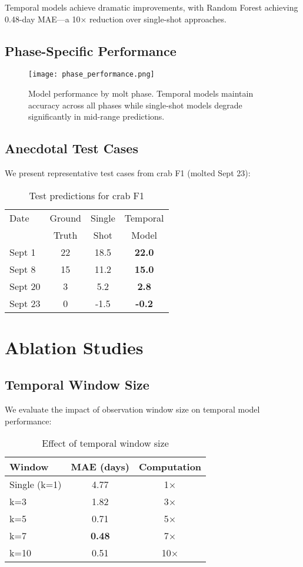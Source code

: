 \documentclass[10pt,twocolumn,letterpaper]{article}
\begin{document}
Temporal models achieve dramatic improvements, with Random Forest achieving 0.48-day MAE—a 10× reduction over single-shot approaches.

\subsection{Phase-Specific Performance}

\begin{figure}[h]
\centering
\texttt{[image: phase\_performance.png]}
\caption{Model performance by molt phase. Temporal models maintain accuracy across all phases while single-shot models degrade significantly in mid-range predictions.}
\end{figure}

\subsection{Anecdotal Test Cases}

We present representative test cases from crab F1 (molted Sept 23):

\begin{table}[h]
\centering
\caption{Test predictions for crab F1}
\begin{tabular}{lccc}
\toprule
Date & Ground & Single & Temporal \\
 & Truth & Shot & Model \\
\midrule
Sept 1 & 22 & 18.5 & \textbf{22.0} \\
Sept 8 & 15 & 11.2 & \textbf{15.0} \\
Sept 20 & 3 & 5.2 & \textbf{2.8} \\
Sept 23 & 0 & -1.5 & \textbf{-0.2} \\
\bottomrule
\end{tabular}
\end{table}

\section{Ablation Studies}

\subsection{Temporal Window Size}
We evaluate the impact of observation window size on temporal model performance:

\begin{table}[h]
\centering
\caption{Effect of temporal window size}
\begin{tabular}{lcc}
\toprule
Window & MAE (days) & Computation \\
\midrule
Single (k=1) & 4.77 & 1× \\
k=3 & 1.82 & 3× \\
k=5 & 0.71 & 5× \\
k=7 & \textbf{0.48} & 7× \\
k=10 & 0.51 & 10× \\
\bottomrule
\end{tabular}
\end{table}
\end{document}
